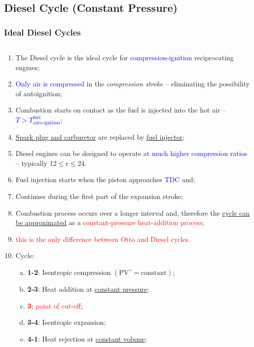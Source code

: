 \documentclass[10pt,compress]{beamer}
\newcommand{\red}{\textcolor{red}}
\newcommand{\blue}{\textcolor{blue}}
\begin{document}
\subsection{Diesel Cycle (Constant Pressure)}
\begin{frame}
 \frametitle{Ideal Diesel Cycles}
  \begin{columns}
   \begin{column}[c]{0.6\linewidth}
    \begin{enumerate}[(1)]\scriptsize
     \item<1-> The Diesel cycle is the ideal cycle for \blue{compression-ignition} reciprocating engines;
     \item<2-> \blue{Only air is compressed} in the {\it compression stroke} -- eliminating the possibility of autoignition;
     \item<3-> Combustion starts on contact as the fuel is injected into the hot air -- \blue{$T>T^{\text{fuel}}_{\text{auto-ignition}}$};
     \item<4-> \underline{Spark plug and carburetor} are replaced by \underline{fuel injector};
     \item<5-> Diesel engines can be designed to operate at \blue{much higher compression ratios} -- typically 12$\leq$r$\leq$24.
     \item<6-> Fuel injection starts when the piston approaches \blue{TDC} and;
     \item<6-> Continues during the first part of the expansion stroke;
     \item<7-> Combustion process occurs over a longer interval and, therefore the \underline{cycle can be approximated} as a \red{constant-pressure heat-addition process};
     \item<8-> \red{this is the only difference between Otto and Diesel cycles}.
     \item<9-> Cycle:
        \begin{enumerate}[(a)]\scriptsize
          \item<10-> {\bf 1-2}: Isentropic compression $\left(\text{PV}^{\gamma}=\text{constant}\right)$;
          \item<10-> {\bf 2-3}: Heat addition at \underline{constant pressure};
          \item<10-> {\bf \red{3}}: \red{point of cut-off};
          \item<10-> {\bf 3-4}: Isentropic expansion;
          \item<10-> {\bf 4-1}: Heat rejection at \underline{constant volume};

\end{enumerate}
\end{enumerate}
\end{column}
\end{columns}
\end{frame}
\end{document}
